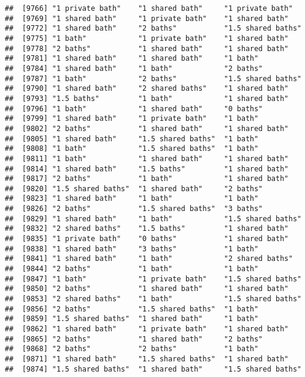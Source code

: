 \documentclass[
]{article}
\begin{document}
\begin{verbatim}
##  [9766] "1 private bath"    "1 shared bath"     "1 private bath"   
##  [9769] "1 shared bath"     "1 private bath"    "1 shared bath"    
##  [9772] "1 shared bath"     "2 baths"           "1.5 shared baths" 
##  [9775] "1 bath"            "1 private bath"    "1 shared bath"    
##  [9778] "2 baths"           "1 shared bath"     "1 shared bath"    
##  [9781] "1 shared bath"     "1 shared bath"     "1 bath"           
##  [9784] "1 shared bath"     "1 bath"            "2 baths"          
##  [9787] "1 bath"            "2 baths"           "1.5 shared baths" 
##  [9790] "1 shared bath"     "2 shared baths"    "1 shared bath"    
##  [9793] "1.5 baths"         "1 bath"            "1 shared bath"    
##  [9796] "1 bath"            "1 shared bath"     "0 baths"          
##  [9799] "1 shared bath"     "1 private bath"    "1 bath"           
##  [9802] "2 baths"           "1 shared bath"     "1 shared bath"    
##  [9805] "1 shared bath"     "1.5 shared baths"  "1 bath"           
##  [9808] "1 bath"            "1.5 shared baths"  "1 bath"           
##  [9811] "1 bath"            "1 shared bath"     "1 shared bath"    
##  [9814] "1 shared bath"     "1.5 baths"         "1 shared bath"    
##  [9817] "2 baths"           "1 bath"            "1 shared bath"    
##  [9820] "1.5 shared baths"  "1 shared bath"     "2 baths"          
##  [9823] "1 shared bath"     "1 bath"            "1 bath"           
##  [9826] "2 baths"           "1.5 shared baths"  "3 baths"          
##  [9829] "1 shared bath"     "1 bath"            "1.5 shared baths" 
##  [9832] "2 shared baths"    "1.5 baths"         "1 shared bath"    
##  [9835] "1 private bath"    "0 baths"           "1 shared bath"    
##  [9838] "1 shared bath"     "3 baths"           "1 bath"           
##  [9841] "1 shared bath"     "1 bath"            "2 shared baths"   
##  [9844] "2 baths"           "1 bath"            "1 bath"           
##  [9847] "1 bath"            "1 private bath"    "1.5 shared baths" 
##  [9850] "2 baths"           "1 shared bath"     "1 shared bath"    
##  [9853] "2 shared baths"    "1 bath"            "1.5 shared baths" 
##  [9856] "2 baths"           "1.5 shared baths"  "1 bath"           
##  [9859] "1.5 shared baths"  "1 shared bath"     "1 bath"           
##  [9862] "1 shared bath"     "1 private bath"    "1 shared bath"    
##  [9865] "2 baths"           "1 shared bath"     "2 baths"          
##  [9868] "2 baths"           "2 baths"           "1 bath"           
##  [9871] "1 shared bath"     "1.5 shared baths"  "1 shared bath"    
##  [9874] "1.5 shared baths"  "1 shared bath"     "1.5 shared baths" 

\end{verbatim}
\end{document}
